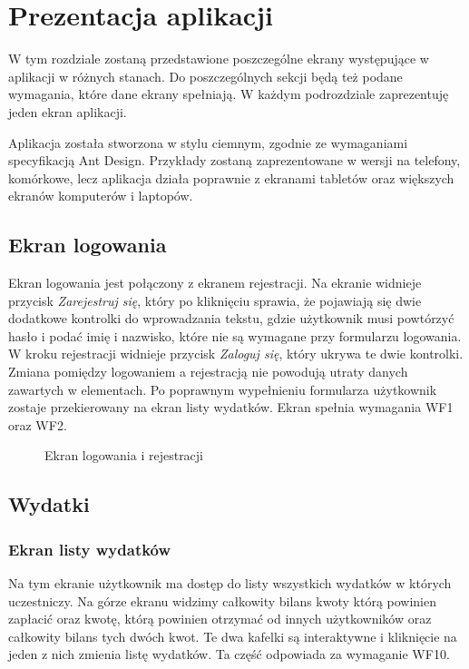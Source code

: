 \newpage
\section{Prezentacja aplikacji}
W tym rozdziale zostaną przedstawione poszczególne ekrany występujące w aplikacji w różnych stanach. Do poszczególnych sekcji będą też podane wymagania, które dane ekrany spełniają. W każdym podrozdziale zaprezentuję jeden ekran aplikacji.
 

Aplikacja została stworzona w stylu ciemnym, zgodnie ze wymaganiami specyfikacją Ant Design. Przykłady zostaną zaprezentowane w wersji na telefony, komórkowe, lecz aplikacja działa poprawnie z ekranami tabletów oraz większych ekranów komputerów i laptopów.

\clearpage
\subsection{Ekran logowania}
Ekran logowania jest połączony z ekranem rejestracji. Na ekranie widnieje przycisk \emph{Zarejestruj się}, który po kliknięciu sprawia, że pojawiają się dwie dodatkowe kontrolki do wprowadzania tekstu, gdzie użytkownik musi powtórzyć hasło i podać imię i nazwisko, które nie są wymagane przy formularzu logowania. W kroku rejestracji widnieje przycisk \emph{Zaloguj się}, który ukrywa te dwie kontrolki. Zmiana pomiędzy logowaniem a rejestracją nie powodują utraty danych zawartych w elementach. Po poprawnym wypełnieniu formularza użytkownik zostaje przekierowany na ekran listy wydatków. Ekran spełnia wymagania WF1 oraz WF2.


\begin{figure}[h!]%
    \centering
    \qquad
    \caption{Ekran logowania i rejestracji}%
\end{figure}

\clearpage
\subsection{Wydatki}
\subsubsection{Ekran listy wydatków}
Na tym ekranie użytkownik ma dostęp do listy wszystkich wydatków w których uczestniczy. Na górze ekranu widzimy całkowity bilans kwoty którą powinien zapłacić oraz kwotę, którą powinien otrzymać od innych użytkowników oraz całkowity bilans tych dwóch kwot. Te dwa kafelki są interaktywne i kliknięcie na jeden z nich zmienia listę wydatków. Ta część odpowiada za wymaganie WF10.

